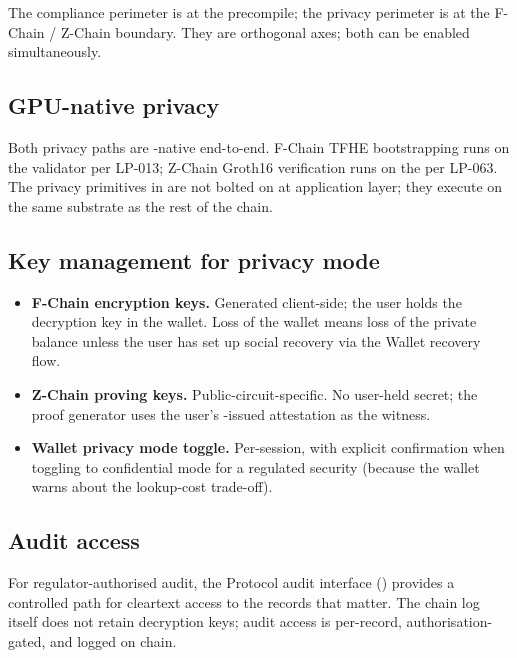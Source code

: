 The compliance perimeter is at the \Liquidity{} precompile; the
privacy perimeter is at the F-Chain / Z-Chain boundary. They are
orthogonal axes; both can be enabled simultaneously.

\subsection{GPU-native privacy}

Both privacy paths are \GPU{}-native end-to-end. F-Chain TFHE
bootstrapping runs on the validator \GPU{} per LP-013; Z-Chain
Groth16 verification runs on the \GPU{} per LP-063. The privacy
primitives in \Zoo{} \DEX{} are not bolted on at application
layer; they execute on the same substrate as the rest of the chain.

\subsection{Key management for privacy mode}

\begin{itemize}[leftmargin=1.2em]
  \item \textbf{F-Chain encryption keys.} Generated client-side;
        the user holds the decryption key in the wallet. Loss of
        the wallet means loss of the private balance unless the
        user has set up social recovery via the \Lux{} Wallet
        recovery flow.
  \item \textbf{Z-Chain proving keys.} Public-circuit-specific.
        No user-held secret; the proof generator uses the user's
        \Liquidity{}-issued attestation as the witness.
  \item \textbf{Wallet privacy mode toggle.} Per-session, with
        explicit confirmation when toggling to confidential mode
        for a regulated security (because the wallet warns about
        the lookup-cost trade-off).
\end{itemize}

\subsection{Audit access}

For regulator-authorised audit, the \Liquidity{} Protocol audit
interface (\cite{liquidity-protocol-formal}) provides a controlled
path for cleartext access to the records that matter. The chain log
itself does not retain decryption keys; audit access is per-record,
authorisation-gated, and logged on chain.
